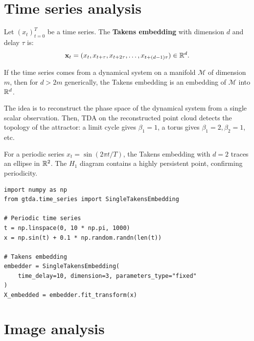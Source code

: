\section{Time series analysis}
\label{sec:time_series}

\begin{definition}
Let $(x_t)_{t=0}^{T}$ be a time series. The \textbf{Takens
embedding} with dimension $d$ and delay $\tau$ is:
\[
  \mathbf{x}_t = (x_t, x_{t+\tau}, x_{t+2\tau}, \ldots,
  x_{t+(d-1)\tau}) \in \mathbb{R}^d.
\]
\end{definition}

\begin{theorem}[Takens, 1981]
If the time series comes from a dynamical system on a manifold
$\mathcal{M}$ of dimension $m$, then for $d > 2m$ generically,
the Takens embedding is an embedding of $\mathcal{M}$ into $\mathbb{R}^d$.
\end{theorem}

\begin{intuition}
The idea is to reconstruct the phase space of the dynamical system
from a single scalar observation. Then, TDA on the reconstructed
point cloud detects the topology of the attractor: a limit cycle
gives $\beta_1 = 1$, a torus gives $\beta_1 = 2, \beta_2 = 1$, etc.
\end{intuition}

\begin{example}
For a periodic series $x_t = \sin(2\pi t / T)$, the Takens embedding
with $d = 2$ traces an ellipse in $\mathbb{R}^2$. The $H_1$ diagram contains
a highly persistent point, confirming periodicity.
\end{example}

\begin{verbatim}
import numpy as np
from gtda.time_series import SingleTakensEmbedding

# Periodic time series
t = np.linspace(0, 10 * np.pi, 1000)
x = np.sin(t) + 0.1 * np.random.randn(len(t))

# Takens embedding
embedder = SingleTakensEmbedding(
    time_delay=10, dimension=3, parameters_type="fixed"
)
X_embedded = embedder.fit_transform(x)
\end{verbatim}

\section{Image analysis}
\label{sec:images}

